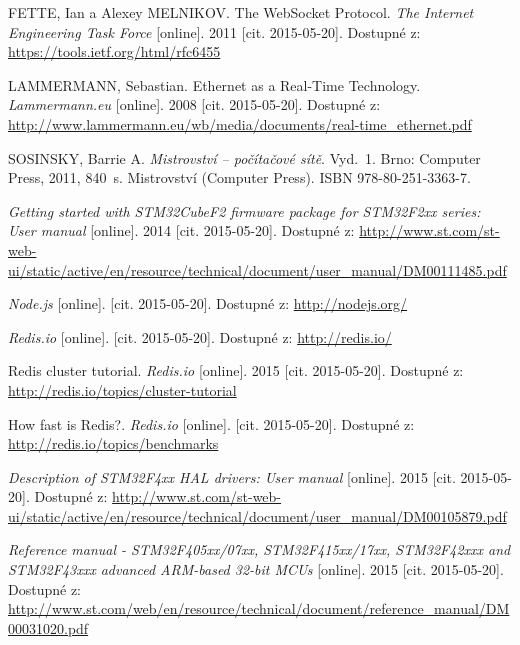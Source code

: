 \documentclass[oneside,12pt,a4paper,final]{book} %
\begin{document}









\begin{thebibliography}{99}

FETTE, Ian a Alexey MELNIKOV. The WebSocket Protocol. \textit{The Internet Engineering Task Force} [online]. 2011 [cit. 2015-05-20]. Dostupné z: \url{https://tools.ietf.org/html/rfc6455}

LAMMERMANN, Sebastian. Ethernet as a Real-Time Technology. \textit{Lammermann.eu} [online]. 2008 [cit. 2015-05-20]. Dostupné z: \url{http://www.lammermann.eu/wb/media/documents/real-time_ethernet.pdf}

SOSINSKY, Barrie A. \textit{Mistrovství – počítačové sítě}. Vyd.~1. Brno: Computer Press, 2011, 840~s. Mistrovství (Computer Press). ISBN 978-80-251-3363-7. 

\textit{Getting started with STM32CubeF2 firmware package for STM32F2xx series: User manual} [online]. 2014 [cit. 2015-05-20]. Dostupné z: \url{http://www.st.com/st-web-ui/static/active/en/resource/technical/document/user_manual/DM00111485.pdf}

\textit{Node.js} [online]. [cit. 2015-05-20]. Dostupné z: \url{http://nodejs.org/}

\textit{Redis.io} [online]. [cit. 2015-05-20]. Dostupné z: \url{http://redis.io/}

Redis cluster tutorial. \textit{Redis.io} [online]. 2015 [cit. 2015-05-20]. Dostupné z: \url{http://redis.io/topics/cluster-tutorial}

How fast is Redis?. \textit{Redis.io} [online]. [cit. 2015-05-20]. Dostupné z: \url{http://redis.io/topics/benchmarks}

\textit{Description of STM32F4xx HAL drivers: User manual} [online]. 2015 [cit. 2015-05-20]. Dostupné z: \url{http://www.st.com/st-web-ui/static/active/en/resource/technical/document/user_manual/DM00105879.pdf}

\textit{Reference manual - STM32F405xx/07xx, STM32F415xx/17xx, STM32F42xxx and STM32F43xxx advanced ARM\textregistered-based 32-bit MCUs} [online]. 2015 [cit. 2015-05-20]. Dostupné z: \url{http://www.st.com/web/en/resource/technical/document/reference_manual/DM00031020.pdf}


\end{thebibliography}
\end{document}

